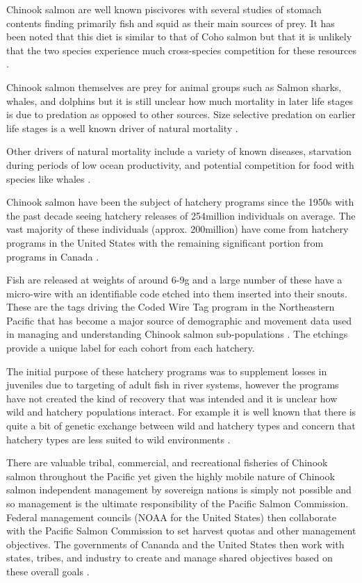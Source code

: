 \documentclass[11pt]{article}
\begin{document}
Chinook salmon are well known piscivores with several studies of stomach contents finding primarily fish and squid as their main sources of prey. It has been noted that this diet is similar to that of Coho salmon but that it is unlikely that the two species experience much cross-species competition for these resources \citep{oceanchinook}. 

Chinook salmon themselves are prey for animal groups such as Salmon sharks, whales, and dolphins but it is still unclear how much mortality in later life stages is due to predation as opposed to other sources. Size selective predation on earlier life stages is a well known driver of natural mortality \citep{oceanchinook}. 

Other drivers of natural mortality include a variety of known diseases, starvation during periods of low ocean productivity, and potential competition for food with species like whales \citep{oceanchinook}.\newline

Chinook salmon have been the subject of hatchery programs since the 1950s with the past decade seeing hatchery releases of 254million individuals on average. The vast majority of these individuals (approx. 200million) have come from hatchery programs in the United States with the remaining significant portion from programs in Canada \citep{oceanchinook}. 

Fish are released at weights of around 6-9g and a large number of these have a micro-wire with an identifiable code etched into them inserted into their snouts. These are the tags driving the Coded Wire Tag program in the Northeastern Pacific that has become a major source of demographic and movement data used in managing and understanding Chinook salmon sub-populations \citep{shelton2019}. The etchings provide a unique label for each cohort from each hatchery. 

The initial purpose of these hatchery programs was to supplement losses in juveniles due to targeting of adult fish in river systems, however the programs have not created the kind of recovery that was intended and it is unclear how wild and hatchery populations interact. For example it is well known that there is quite a bit of genetic exchange between wild and hatchery types and concern that hatchery types are less suited to wild environments \citep{oceanchinook}. \newline

There are valuable tribal, commercial, and recreational fisheries of Chinook salmon throughout the Pacific \citep{salmonplan} yet given the highly mobile nature of Chinook salmon independent management by sovereign nations is simply not possible and so management is the ultimate responsibility of the Pacific Salmon Commission. Federal management councils (NOAA for the United States) then collaborate with the Pacific Salmon Commission to set harvest quotas and other management objectives. The governments of Cananda and the United States then work with states, tribes, and industry to create and manage shared objectives based on these overall goals \citep{NOAA22}. 
\end{document}

